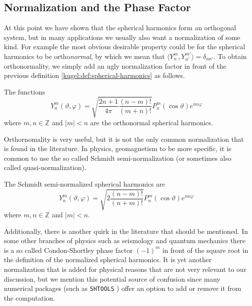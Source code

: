 \subsection{Normalization and the Phase Factor}

At this point we have shown that the spherical harmonics form an orthogonal
system, but in many applications we usually also want a normalization of some
kind. For example the most obvious desirable property could be for the spherical
harmonics to be ortho\emph{normal}, by which we mean that $\langle Y^m_n,
Y^{m'}_{n'} \rangle = \delta_{nn'}$. To obtain orthonormality, we simply add an
ugly normalization factor in front of the previous definition
\ref{kugel:def:spherical-harmonics} as follows.

\begin{definition}
  \label{kugel:def:spherical-harmonics-orthonormal}
  The functions
  \begin{equation*}
    Y^m_n(\vartheta, \varphi)
    = \sqrt{\frac{2n + 1}{4\pi} \frac{(n-m)!}{(m+n)!}}
      P^m_n(\cos \vartheta) e^{im\varphi}
  \end{equation*}
  where $m, n \in \mathbb{Z}$ and $|m| < n$ are the orthonormal spherical
  harmonics.
\end{definition}

Orthornomality is very useful, but it is not the only common normalization that
is found in the literature. In physics, geomagnetism to be more specific, it is
common to use the so called Schmidt semi-normalization (or sometimes also called
quasi-normalization).

\begin{definition}
  \label{kugel:def:spherical-harmonics-schmidt}
  The Schmidt semi-normalized spherical harmonics are
  \begin{equation*}
    Y^m_n(\vartheta, \varphi)
    = \sqrt{2 \frac{(n - m)!}{(n + m)!}}
      P^m_n(\cos \vartheta) e^{im\varphi}
  \end{equation*}
  where $m, n \in \mathbb{Z}$ and $|m| < n$.
\end{definition}

Additionally, there is another quirk in the literature that should be mentioned.
In some other branches of physics such as seismology and quantum mechanics there
is a so called Condon-Shortley phase factor $(-1)^m$ in front of the square root
in the definition of the normalized spherical harmonics. It is yet another
normalization that is added for physical reasons that are not very relevant to
our discussion, but we mention this potential source of confusion since many
numerical packages (such as \texttt{SHTOOLS}
\cite{markwieczorek_shtoolsshtools_2022}) offer an option to add or remove it
from the computation.

